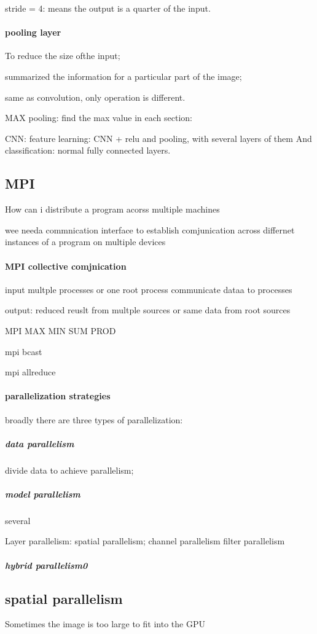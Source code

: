 \documentclass[12pt]{article}
\begin{document}
stride = 4: means the output is a quarter of the input.

\paragraph{pooling layer}
 
To reduce the size ofthe input;

summarized the information for a particular part of the image;

same as convolution, only operation is different.

MAX pooling: find the max value in each section: 

CNN: feature learning: CNN + relu and pooling, with several layers of them
And classification: normal fully connected layers.

\subsection{MPI}
How can i distribute a program acorss multiple machines

wee needa commnication interface to establish comjunication across differnet instances of a program on multiple devices
\paragraph{MPI collective comjnication}
input multple processes or one root process communicate dataa to processes

output: reduced reuslt from multple sources or same data from root sources

MPI MAX MIN SUM PROD

mpi bcast

mpi allreduce

\paragraph{parallelization strategies}
broadly there are three types of parallelization: 
\subparagraph{data parallelism}
divide data to achieve parallelism;

\subparagraph{model parallelism} several

Layer parallelism: 
spatial parallelism;
channel parallelism 
filter parallelism

\subparagraph{hybrid parallelism0}

\subsection{spatial parallelism}
Sometimes the image is too large to fit into the GPU
\end{document}
